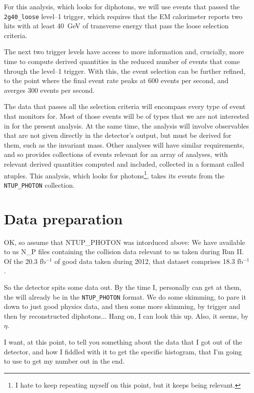  For this analysis, which looks for diphotons, we will use events that passed the \texttt{2g40\_loose} level--1 trigger, which requires that the EM calorimeter reports two hits with at least 40~GeV of transverse energy that pass the loose selection criteria.

The next two trigger levels have access to more information and, crucially, more time to compute derived quantities in the reduced number of events that come through the level--1 trigger. With this, the event selection can be further refined, to the point where the final event rate peaks at 600 events per second, and averges 300 events per second.

The data that passes all the selection criteria will encompass every type of event that \atlas{} monitors for. Most of those events will be of types that we are not interested in for the present analysis. At the same time, the analysis will involve observables that are not given directly in the detector's output, but must be derived for them, such as the invariant mass. Other analyses will have similar requirements, and so \atlas{} provides collections of events relevant for an array of analyses, with relevant derived quantities computed and included, collected in a formant called ntuples. This analysis, which looks for photons\footnote{I hate to keep repeating myself on this point, but it keeps being relevant.}, takes its events from the \texttt{NTUP\_PHOTON} collection.


\chapter{Data preparation}

OK, so assume that NTUP\_PHOTON was intorduced above: We have available to us N\_P files containing the collision data relevant to us taken during Run II. Of the 20.3 fb$^{-1}$ of good data taken during 2012, that dataset comprises 18.3 fb$^{-1}$.

So the detector spits some data out. By the time I, personally can get at them, the will already be in the \texttt{NTUP\_PHOTON} format. We do some skimming, to pare it down to just good physics data, and then some more skimming, by trigger and then by reconstructed diphotons... Hang on, I can look this up. Also, it seems, by $\eta$.

I want, at this point, to tell you something about the data that I got out of the detector, and how I fiddled with it to get the specific histogram, that I'm going to use to get my number out in the end.

